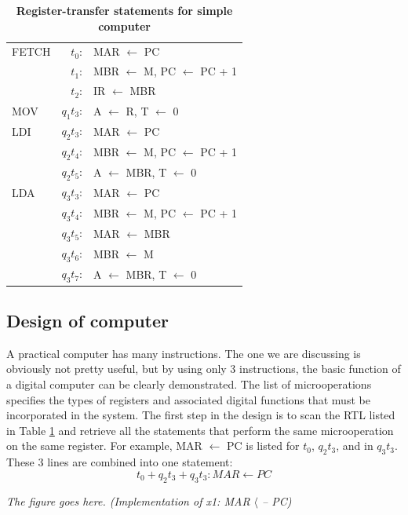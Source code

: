 \documentclass{book}
\begin{document}
\begin{table}[h,c]

\begin{center}
 \begin{tabular}{l r l}
 	\hline
 	FETCH & $t_0$: & MAR $\leftarrow$ PC \\
		  & $t_1$: & MBR $\leftarrow$ M, PC $\leftarrow$ PC + 1 \\
		  & $t_2$: & IR $\leftarrow$ MBR \\
	\hline
	MOV & $q_1t_3$: & A $\leftarrow$ R, T $\leftarrow$ 0 \\
	\hline
	LDI	& $q_2t_3$: & MAR $\leftarrow$ PC\\
		& $q_2t_4$: & MBR $\leftarrow$ M, PC $\leftarrow$ PC + 1 \\
		& $q_2t_5$: & A $\leftarrow$ MBR, T $\leftarrow$ 0\\
	\hline
	LDA & $q_3t_3$: & MAR $\leftarrow$ PC \\
		& $q_3t_4$: & MBR $\leftarrow$ M, PC $\leftarrow$ PC + 1 \\
		& $q_3t_5$: & MAR $\leftarrow$ MBR \\
		& $q_3t_6$: & MBR $\leftarrow$ M \\
		& $q_3t_7$: & A $\leftarrow$ MBR, T $\leftarrow$ 0\\
	\hline
  \end{tabular}
  \caption{\textbf{Register-transfer statements for simple computer}}
  \label{rtl_simple}
 \end{center}
\end{table}

\subsection{Design of computer}

A practical computer has many instructions. The one we are discussing is obviously not pretty useful, but by using only 3 instructions, the basic function of a digital computer can be clearly demonstrated. The list of microoperations specifies the types of registers and associated digital functions that must be incorporated in the system. The first step in the design is to scan the RTL listed in Table \ref{rtl_simple} and retrieve all the statements that perform the same microoperation on the same register. For example, MAR $\leftarrow$ PC is listed for $t_0$, $q_2t_3$, and in $q_3t_3$. These 3 lines are combined into one statement: $$t_0 + q_2t_3 + q_3t_3: MAR \leftarrow PC$$

{
  {\color{red} \textit{\huge The figure goes here. (Implementation of x1: MAR $\langle$ -- PC)} }
}
\end{document}
